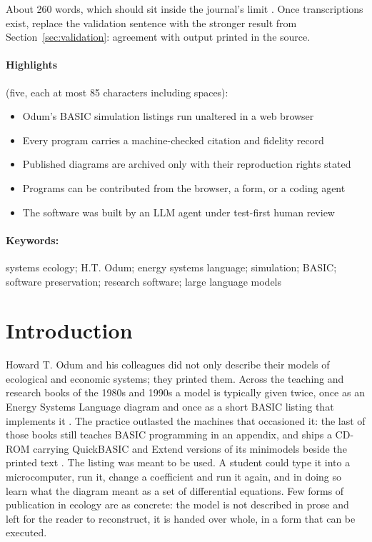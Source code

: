 \begin{abstract}
\end{abstract}

\begin{plan}
About 260 words, which should sit inside the journal's limit \verify. Once transcriptions exist, replace the validation sentence with the stronger result from Section~\ref{sec:validation}: agreement with output printed in the source.
\end{plan}

\paragraph{Highlights} (five, each at most 85 characters including spaces):
\begin{itemize}
\item Odum's BASIC simulation listings run unaltered in a web browser
\item Every program carries a machine-checked citation and fidelity record
\item Published diagrams are archived only with their reproduction rights stated
\item Programs can be contributed from the browser, a form, or a coding agent
\item The software was built by an LLM agent under test-first human review
\end{itemize}

\paragraph{Keywords:} systems ecology; H.T. Odum; energy systems language; simulation; BASIC; software preservation; research software; large language models

\section{Introduction}
\label{sec:intro}

Howard T. Odum and his colleagues did not only describe their models of ecological and economic systems; they printed them. Across the teaching and research books of the 1980s and 1990s a model is typically given twice, once as an Energy Systems Language diagram and once as a short BASIC listing that implements it \citep{odum1983,odumMinimodels,odumOdum2000}. The practice outlasted the machines that occasioned it: the last of those books still teaches BASIC programming in an appendix, and ships a CD-ROM carrying QuickBASIC and Extend versions of its minimodels beside the printed text \citep{odumOdum2000}. The listing was meant to be used. A student could type it into a microcomputer, run it, change a coefficient and run it again, and in doing so learn what the diagram meant as a set of differential equations. Few forms of publication in ecology are as concrete: the model is not described in prose and left for the reader to reconstruct, it is handed over whole, in a form that can be executed.

